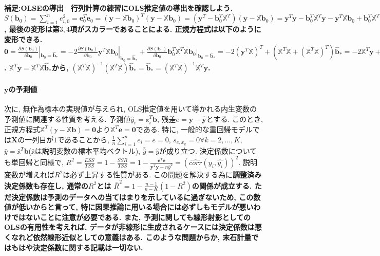 \documentclass[paper=a4paper,fontsize=10pt]{jlreq}
\begin{document}
\rmfamily\mcfamily\bfseries{補足:OLSEの導出}\mdseries　行列計算の練習にOLS推定値の導出を確認しよう. $S(\mathbf{b}_{0})=\sum_{i = 1}^{n} e_{i,0}^{2}=\mathbf{e}_{0}^{T}\mathbf{e}_{0}=(\mathbf{y}-\mathbb{X}\mathbf{b}_{0})^{T}(\mathbf{y}-\mathbb{X}\mathbf{b}_{0})=(\mathbf{y}^{T}-\mathbf{b}_{0}^{T}\mathbb{X}^{T})(\mathbf{y}-\mathbb{X}\mathbf{b}_{0})=\mathbf{y}^{T}\mathbf{y}-\mathbf{b}_{0}^{T}\mathbb{X}^{T}\mathbf{y}-\mathbf{y}^{T}\mathbb{X}\mathbf{b}_{0}+\mathbf{b}_{0}^{T}\mathbb{X}^{T}\mathbb{X}\mathbf{b}_{0}=\mathbf{y}^{T}\mathbf{y}-2\mathbf{y}^{T}\mathbb{X}\mathbf{b}_{0}+\mathbf{b}_{0}^{T}\mathbb{X}^{T}\mathbb{X}\mathbf{b}_{0}$, 最後の変形は第$3,4$項がスカラーであることによる. 正規方程式は以下のように変形できる. $\mathbf{0}=\frac{\partial S(\mathbf{b}_{0})}{\partial\mathbf{b}_0}|_{\mathbf{b}_0=\hat{\mathbf{b}}_*}=-2\frac{\partial S(\mathbf{b}_{0})}{\partial\mathbf{b}_0}\mathbf{y}^{T}\mathbb{X}\mathbf{b}_{0}|_{\mathbf{b}_0=\hat{\mathbf{b}}_*}+\frac{\partial S(\mathbf{b}_{0})}{\partial\mathbf{b}_0}\mathbf{b}_{0}^{T}\mathbb{X}^{T}\mathbb{X}\mathbf{b}_{0}|_{\mathbf{b}_0=\hat{\mathbf{b}}_*}=-2(\mathbf{y}^{T}\mathbb{X})^{T}+(\mathbb{X}^{T}\mathbb{X}+(\mathbb{X}^{T}\mathbb{X})^{T})\hat{\mathbf{b}}_*=-2\mathbb{X}^{T}\mathbf{y}+2\mathbb{X}^{T}\mathbb{X}\hat{\mathbf{b}}_*$. $\mathbb{X}^{T}\mathbf{y}=\mathbb{X}^{T}\mathbb{X}\hat{\mathbf{b}}_*$から, $(\mathbb{X}^{T}\mathbb{X})^{-1}(\mathbb{X}^{T}\mathbb{X})\hat{\mathbf{b}}_*=\hat{\mathbf{b}}_*=(\mathbb{X}^{T}\mathbb{X})^{-1}\mathbb{X}^{T}\mathbf{y}$.\\

\paragraph{$\mathbf{y}$の予測値}
次に, 無作為標本の実現値が与えられ, OLS推定値を用いて導かれる内生変数の予測値に関連する性質を考える. 予測値$\hat{y}_i=\mathbb{x}_i^{T}\mathbf{b}$, 残差$e=\mathbf{y}-\hat{\mathbf{y}}$とする. このとき, 正規方程式$\mathbb{X}^T(\mathbb{y}-\mathbb{X}\mathbf{b})=\mathbf{0}$より$\mathbb{X}^T\mathbf{e}=\mathbf{0}$である. 特に, 一般的な重回帰モデルでは$\mathbf{X}$の一列目が$1$であることから, $\frac{1}{n}\sum_{i=1}^{n}e_i=\bar{e}=0$, $s_{e, x_k}=0　\forall k=2,\dots,K$, $\bar{y}=\bar{\mathbb{x}}^{T}\mathbf{b}$($\bar{\mathbb{x}}$は説明変数の標本平均ベクトル), $\bar{\hat{y}}=\hat{y}$が成り立つ. 決定係数についても単回帰と同様で, $R^2=\frac{ESS}{TSS}=1-\frac{SSR}{TSS}=1-\frac{\mathbf{e}^T\mathbf{e}}{\mathbf{y}^T\mathbf{y}-n\bar{y}^2}=(\hat{corr}(y_i,\hat{y_i}))^2$. 説明変数が増えれば$R^2$は必ず上昇する性質がある. この問題を解決する為に\rmfamily\mcfamily\bfseries{調整済み決定係数}\mdseries も存在し, 通常の$R^2$とは $\bar{R}^2=1-\frac{n-1}{n-K}(1-R^2)$の関係が成立する. ただ決定係数は予測のデータへの当てはまりを示しているに過ぎないため, この数値が低いからと言って, 特に因果推論に用いる場合には必ずしもモデルが悪いわけではないことに注意が必要である. また, 予測に関しても線形射影としてのOLSの有用性を考えれば, データが非線形に生成されるケースには決定係数は悪くなれど依然線形近似としての意義はある. このような問題からか, 末石計量ではもはや決定係数に関する記載は一切ない.\\
\end{document}
